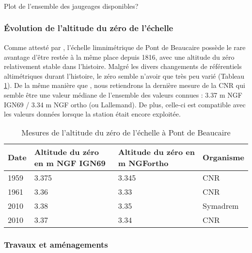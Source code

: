\documentclass[11pt]{article}
\begin{document}
    Plot de l'ensemble des jaugeages disponibles?
	
	\subsubsection{Évolution de l'altitude du zéro de l'échelle}
    
    \paragraph{} Comme attesté par \citep{pichard_hauteurs_2013}, l'échelle limnimétrique de Pont de Beaucaire possède le rare avantage d'être restée à la même place depuis 1816, avec une altitude du zéro relativement stable dans l'histoire. Malgré les divers changements de référentiels altimétriques durant l'histoire, le zéro semble n'avoir que très peu varié (Tableau \ref{tab:zeroPt}). De la même manière que \citet{bard_actualisation_2018}, nous retiendrons la dernière mesure de la CNR qui semble être une valeur médiane de l'ensemble des valeurs connues : 3.37 m NGF IGN69 / 3.34 m NGF ortho (ou Lallemand). De plus, celle-ci est compatible avec les valeurs données lorsque la station était encore exploitée.

            \begin{table}[h]
                \centering
                \caption{Mesures de l'altitude du zéro de l'échelle à Pont de Beaucaire}
            	\label{tab:zeroPt}
                \begin{tabular}{| m{3cm} | m{3cm}| m{3cm} | m{3cm} |} 
                    \hline
                    Date & Altitude du zéro en m NGF IGN69 & Altitude du zéro en m NGFortho	& Organisme \\
                    \hline
                    1959 &	3.375 &	3.345 &	CNR\\
                    \hline
                    1961 &	3.36 &	3.33 &	CNR\\
                    \hline
                    2010 &	3.38 &	3.35 &	Symadrem\\
                    \hline
                    2010 &	3.37 &	3.34 &	CNR\\
                    \hline
            \end{tabular}
        \end{table}


\FloatBarrier
		\subsubsection{Travaux et aménagements}
    	\label{subsubsec:TravauxPt}
    
\end{document}
